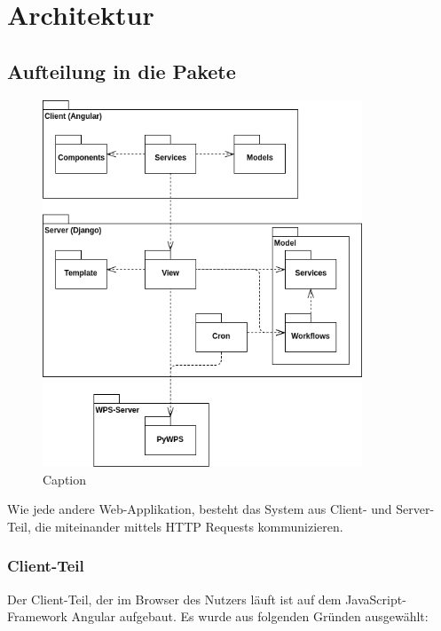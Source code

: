 \chapter{Architektur}

    \section{Aufteilung in die Pakete}
    
    \begin{figure}[h]
        \centering
        \includegraphics[width=0.85\textwidth]{images/package_diagram.png}
        \caption{Caption}
        \label{fig:arch_package_division}
    \end{figure}
    
    \noindent Wie jede andere Web-Applikation, besteht das System aus Client- und Server-Teil, die miteinander mittels HTTP Requests kommunizieren.
    
        \subsection{Client-Teil}
        
        Der Client-Teil, der im Browser des Nutzers läuft ist auf dem JavaScript-Framework Angular aufgebaut. Es wurde aus folgenden Gründen ausgewählt:
        
